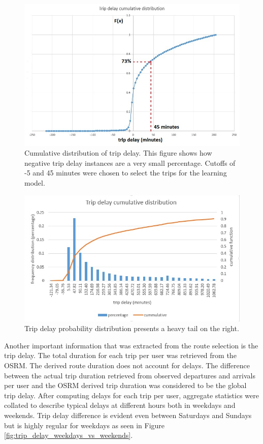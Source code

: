 \documentclass[12pt, a4paper]{report}
\theoremstyle{definition}
\theoremstyle{definition}%
\theoremstyle{definition}%
\theoremstyle{definition}%
\theoremstyle{definition}%
\theoremstyle{definition}%
\begin{document}
\begin{figure}[hp]	
	\includegraphics[scale=0.60]{Trip_delay_cumm_distribution.jpg}
	\centering
	\caption[Trip delay cumulative distribution]{Cumulative distribution of trip delay. This figure shows how negative trip delay instances are a very small percentage. Cutoffs  of -5 and 45 minutes were chosen to select the trips for the learning model.  }
	\label{fig:trip_delay_cum_distribution}
\end{figure}

\begin{figure}[!]	
	\includegraphics[scale=0.80]{trip_delay_cumm_distribution_total.jpg}
	\centering
	\caption[Trip delay total cumulative distribution]{Trip delay probability distribution presents a heavy tail on the right.  }
	\label{fig:trip_delay_cum_distribution_heavy_tail}
\end{figure}

Another important information that was extracted from the route selection is the trip delay. The total duration for each trip per user was retrieved from the OSRM. The derived route duration does not account for delays. The difference between the actual trip duration retrieved from observed departures and arrivals per user and the OSRM derived trip duration was considered to be the global trip delay. After computing delays for each trip per user, aggregate statistics were collated to describe typical delays at different hours both in weekdays and weekends. Trip delay difference is evident even between Saturdays and Sundays but is highly regular for weekdays as seen in Figure  \ref{fig:trip_delay_weekdays_vs_weekends}. 
\end{document}
